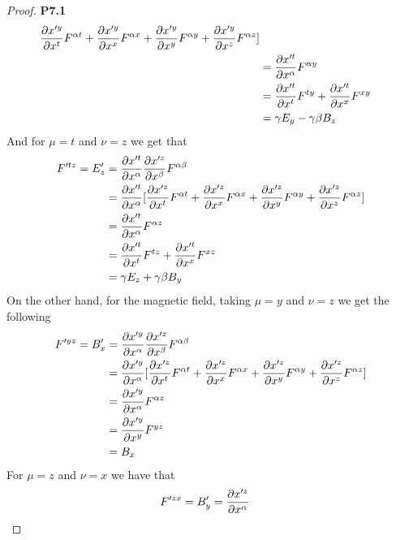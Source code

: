 \documentclass[11pt]{article}
\theoremstyle{definition}
\begin{document}
\begin{proof}{\textbf{P7.1}}
\begin{align*}
            \partialderivative{x'^y}{x^t} F^{\alpha t}
            + \partialderivative{x'^y}{x^x} F^{\alpha x}
            + \partialderivative{x'^y}{x^y} F^{\alpha y}
            + \partialderivative{x'^y}{x^z} F^{\alpha z}
        ]\\
        &= \partialderivative{x'^t}{x^\alpha}F^{\alpha y}\\
        &= \partialderivative{x'^t}{x^t}F^{t y}
        + \partialderivative{x'^t}{x^x}F^{x y}\\
        &= \gamma E_y - \gamma\beta B_z
    \end{align*}
    And for $\mu=t$ and $\nu=z$ we get that
    \begin{align*}
        F'^{tz} = E'_z &= \partialderivative{x'^t}{x^\alpha}
        \partialderivative{x'^z}{x^\beta} F^{\alpha\beta}\\
        &= \partialderivative{x'^t}{x^\alpha}[
            \partialderivative{x'^z}{x^t} F^{\alpha t}
            + \partialderivative{x'^z}{x^x} F^{\alpha x}
            + \partialderivative{x'^z}{x^y} F^{\alpha y}
            + \partialderivative{x'^z}{x^z} F^{\alpha z}
        ]\\
        &= \partialderivative{x'^t}{x^\alpha}F^{\alpha z}\\
        &= \partialderivative{x'^t}{x^t}F^{t z}
        + \partialderivative{x'^t}{x^x}F^{x z}\\
        &= \gamma E_z + \gamma\beta B_y
    \end{align*}
    On the other hand, for the magnetic field, taking $\mu=y$ and $\nu=z$
    we get the following
    \begin{align*}
        F'^{yz} = B'_x &= \partialderivative{x'^y}{x^\alpha}
        \partialderivative{x'^z}{x^\beta} F^{\alpha\beta}\\
        &= \partialderivative{x'^y}{x^\alpha}[
            \partialderivative{x'^z}{x^t} F^{\alpha t}
            + \partialderivative{x'^z}{x^x} F^{\alpha x}
            + \partialderivative{x'^z}{x^y} F^{\alpha y}
            + \partialderivative{x'^z}{x^z} F^{\alpha z}
        ]\\
        &= \partialderivative{x'^y}{x^\alpha}F^{\alpha z}\\
        &= \partialderivative{x'^y}{x^y}F^{y z}\\
        &= B_x
    \end{align*}
    For $\mu=z$ and $\nu=x$ we have that
    \begin{align*}
        F'^{zx} = B'_y &= \partialderivative{x'^z}{x^\alpha}

\end{align*}
\end{proof}
\end{document}
